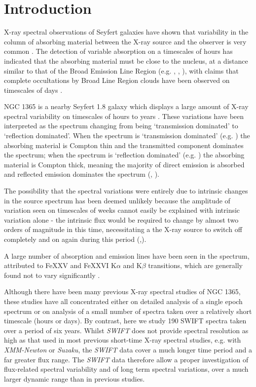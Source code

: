 \documentclass[useAMS,usenatbib]{sam}
\begin{document}
\section{Introduction}

X-ray spectral observations of Seyfert galaxies have shown that variability in the column of absorbing material between the X-ray source and the observer is very
common \citep{risaliti02}. The detection of variable absorption on a timescales of hours has indicated that the absorbing material must be close to the nucleus, at a
distance similar to that of the Broad Emission Line Region  (e.g. \citet{lamer}, \citet{elvis04}, \citet{puccetti}), with claims that complete occultations by Broad Line
Region clouds have been observed on timescales of days \citep{risaliti07a}.


NGC 1365 is a nearby Seyfert 1.8 galaxy \citep{maiolino95} which displays a large amount of X-ray spectral variability \citep{risaliti09} on timescales of hours
to years \citep{brenneman}. These variations have been interpreted as the spectrum changing from being `transmission dominated' to `reflection
dominated'. When the spectrum is `transmission dominated' (e.g. \citet{risaliti00}) the absorbing material is Compton thin and the transmitted component dominates the
spectrum; when the spectrum is `reflection dominated' (e.g. \citet{iyomoyo}) the absorbing material is Compton thick, meaning the majority of direct emission is absorbed
and reflected emission dominates the spectrum (\citet{risaliti07b}, \citet{matt}). 

The possibility that the spectral variations were entirely due to intrinsic changes in the source spectrum has been deemed unlikely because the amplitude of variation
seen on timescales of weeks cannot easily be explained with intrinsic variation alone - the intrinsic flux would be required to change by almost two orders of magnitude
in this time, necessitating a the X-ray source to switch off completely and on again during this period (\citet{risaliti07b},\citet{risaliti05b}). 

A large number of absorption and emission lines have been seen in the spectrum, attributed to FeXXV and FeXXVI K$\alpha$ and K$\beta$ transitions, which are generally
found not to vary significantly \citep{risaliti05b}.

Although there have been many previous X-ray spectral studies of NGC 1365, these studies have all concentrated either on detailed analysis of a single epoch spectrum or
on analysis of a small number of spectra taken over a relatively short timescale (hours or days). By contrast, here we study 190 SWIFT spectra taken over a period of six
years. Whilst {\it SWIFT} does not provide spectral resolution as high as that used in most previous short-time X-ray spectral studies, e.g. with {\it XMM-Newton} or {\it
Suzaku}, the {\it SWIFT} data cover a much longer time period and a far greater flux range. The {\it SWIFT} data therefore allow a proper investigation of flux-related
spectral variability and of long term spectral variations, over a much larger dynamic range than in previous studies.
\end{document}
